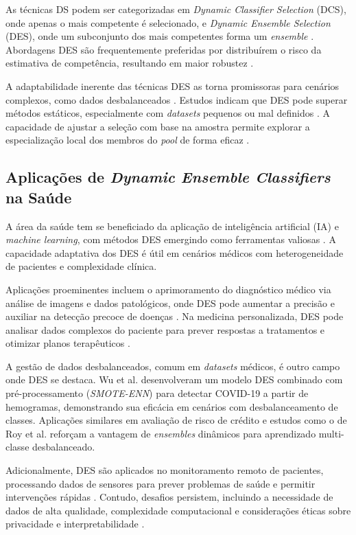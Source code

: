 \documentclass[12pt]{article}
\begin{document}
As técnicas DS podem ser categorizadas em \textit{Dynamic Classifier Selection} (DCS), onde apenas o mais competente é selecionado, e \textit{Dynamic Ensemble Selection} (DES), onde um subconjunto dos mais competentes forma um \textit{ensemble} \cite{ICPRAI2018SI}. Abordagens DES são frequentemente preferidas por distribuírem o risco da estimativa de competência, resultando em maior robustez \cite{KO20081718}.

A adaptabilidade inerente das técnicas DES \cite{Javed2024} as torna promissoras para cenários complexos, como dados desbalanceados \cite{Wu2021, Javed2024}. Estudos indicam que DES pode superar métodos estáticos, especialmente com \textit{datasets} pequenos ou mal definidos \cite{Cruz_2015, ICPRAI2018SI}. A capacidade de ajustar a seleção com base na amostra permite explorar a especialização local dos membros do \textit{pool} de forma eficaz \cite{ICPRAI2018SI}.

\subsection{Aplicações de \textit{Dynamic Ensemble Classifiers} na Saúde} 
A área da saúde tem se beneficiado da aplicação de inteligência artificial (IA) e \textit{machine learning}, com métodos DES emergindo como ferramentas valiosas \cite{Javed2024}. A capacidade adaptativa dos DES é útil em cenários médicos com heterogeneidade de pacientes e complexidade clínica.

Aplicações proeminentes incluem o aprimoramento do diagnóstico médico via análise de imagens e dados patológicos, onde DES pode aumentar a precisão e auxiliar na detecção precoce de doenças \cite{Javed2024}. Na medicina personalizada, DES pode analisar dados complexos do paciente para prever respostas a tratamentos e otimizar planos terapêuticos \cite{Javed2024}.

A gestão de dados desbalanceados, comum em \textit{datasets} médicos, é outro campo onde DES se destaca. Wu et al. \cite{Wu2021} desenvolveram um modelo DES combinado com pré-processamento (\textit{SMOTE-ENN}) para detectar COVID-19 a partir de hemogramas, demonstrando sua eficácia em cenários com desbalanceamento de classes. Aplicações similares em avaliação de risco de crédito \cite{Wu2021} e estudos como o de Roy et al. \cite{ICPRAI2018SI} reforçam a vantagem de \textit{ensembles} dinâmicos para aprendizado multi-classe desbalanceado.

Adicionalmente, DES são aplicados no monitoramento remoto de pacientes, processando dados de sensores para prever problemas de saúde e permitir intervenções rápidas \cite{Javed2024}. Contudo, desafios persistem, incluindo a necessidade de dados de alta qualidade, complexidade computacional e considerações éticas sobre privacidade e interpretabilidade \cite{Javed2024}.
\end{document}
